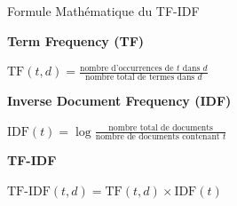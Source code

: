 \documentclass[aspectratio=169,11pt]{beamer}
\begin{document}
\begin{frame}{Formule Mathématique du TF-IDF}
    \begin{center}
        \Large
        \textbf{Term Frequency (TF)}
        \vspace{0.5cm}
        
        $\text{TF}(t, d) = \frac{\text{nombre d'occurrences de } t \text{ dans } d}{\text{nombre total de termes dans } d}$
        
        \vspace{1cm}
        \textbf{Inverse Document Frequency (IDF)}
        \vspace{0.5cm}
        
        $\text{IDF}(t) = \log\frac{\text{nombre total de documents}}{\text{nombre de documents contenant } t}$
        
        \vspace{1cm}
        \textbf{TF-IDF}
        \vspace{0.5cm}
        
        $\text{TF-IDF}(t, d) = \text{TF}(t, d) \times \text{IDF}(t)$
    \end{center}
\end{frame}
\end{document}
